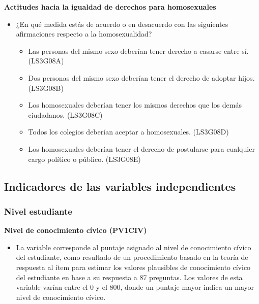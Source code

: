 \documentclass[12pt,twoside]{templates/facsothesis}
\providecommand{\tightlist}{%
  \setlength{\itemsep}{0pt}\setlength{\parskip}{0pt}}
\begin{document}
\textbf{Actitudes hacia la igualdad de derechos para homosexuales}

\begin{itemize}
\item
  ¿En qué medida estás de acuerdo o en desacuerdo con las siguientes afirmaciones respecto a la homosexualidad?

  \begin{itemize}
  \tightlist
  \item
    Las personas del mismo sexo deberían tener derecho a casarse entre sí. (LS3G08A)
  \item
    Dos personas del mismo sexo deberían tener el derecho de adoptar hijos. (LS3G08B)
  \item
    Los homosexuales deberían tener los mismos derechos que los demás ciudadanos. (LS3G08C)
  \item
    Todos los colegios deberían aceptar a homosexuales. (LS3G08D)
  \item
    Los homosexuales deberían tener el derecho de postularse para cualquier cargo político o público. (LS3G08E)
  \end{itemize}
\end{itemize}

\hypertarget{indicadores-de-las-variables-independientes}{%
\subsection{Indicadores de las variables independientes}\label{indicadores-de-las-variables-independientes}}

\hypertarget{nivel-estudiante}{%
\subsubsection{Nivel estudiante}\label{nivel-estudiante}}

\textbf{Nivel de conocimiento cívico (PV1CIV)}

\begin{itemize}
\tightlist
\item
  La variable corresponde al puntaje asignado al nivel de conocimiento cívico del estudiante, como resultado de un procedimiento basado en la teoría de respuesta al ítem para estimar los valores plausibles de conocimiento cívico del estudiante en base a su respuesta a 87 preguntas. Los valores de esta variable varían entre el 0 y el 800, donde un puntaje mayor indica un mayor nivel de conocimiento cívico.
\end{itemize}
\end{document}
